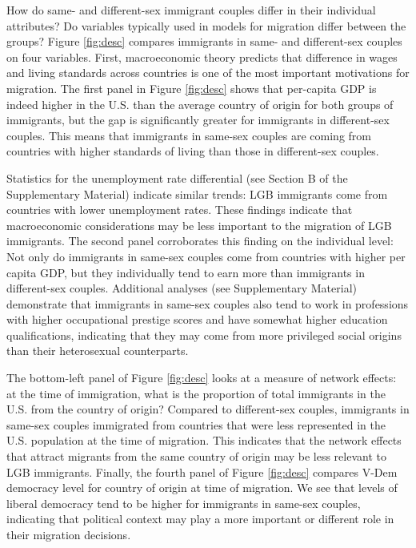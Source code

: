 \documentclass[
  11pt,
]{article}
\begin{document}
How do same- and different-sex immigrant couples differ in their individual attributes? Do variables typically used in models for migration differ between the groups? Figure \ref{fig:desc} compares immigrants in same- and different-sex couples on four variables. First, macroeconomic theory predicts that difference in wages and living standards across countries is one of the most important motivations for migration. The first panel in Figure \ref{fig:desc} shows that per-capita GDP is indeed higher in the U.S. than the average country of origin for both groups of immigrants, but the gap is significantly greater for immigrants in different-sex couples. This means that immigrants in same-sex couples are coming from countries with higher standards of living than those in different-sex couples.

Statistics for the unemployment rate differential (see Section B of the Supplementary Material) indicate similar trends: LGB immigrants come from countries with lower unemployment rates. These findings indicate that macroeconomic considerations may be less important to the migration of LGB immigrants. The second panel corroborates this finding on the individual level: Not only do immigrants in same-sex couples come from countries with higher per capita GDP, but they individually tend to earn more than immigrants in different-sex couples. Additional analyses (see Supplementary Material) demonstrate that immigrants in same-sex couples also tend to work in professions with higher occupational prestige scores and have somewhat higher education qualifications, indicating that they may come from more privileged social origins than their heterosexual counterparts.

The bottom-left panel of Figure \ref{fig:desc} looks at a measure of network effects: at the time of immigration, what is the proportion of total immigrants in the U.S. from the country of origin? Compared to different-sex couples, immigrants in same-sex couples immigrated from countries that were less represented in the U.S. population at the time of migration. This indicates that the network effects that attract migrants from the same country of origin may be less relevant to LGB immigrants. Finally, the fourth panel of Figure \ref{fig:desc} compares V-Dem democracy level for country of origin at time of migration. We see that levels of liberal democracy tend to be higher for immigrants in same-sex couples, indicating that political context may play a more important or different role in their migration decisions.
\end{document}

